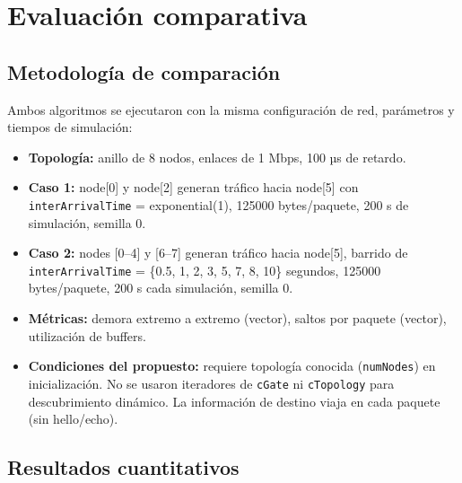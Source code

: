 \documentclass[10pt,letterpaper,twocolumn]{article}
\begin{document}
\FloatBarrier

\section{Evaluación comparativa}
\label{sec:evaluacion}

\subsection{Metodología de comparación}

Ambos algoritmos se ejecutaron con la misma configuración de red, parámetros y tiempos de simulación:
\begin{itemize}
  \item \textbf{Topología:} anillo de 8 nodos, enlaces de 1 Mbps, 100 µs de retardo.
  \item \textbf{Caso 1:} node[0] y node[2] generan tráfico hacia node[5] con \texttt{interArrivalTime} = exponential(1), 125000 bytes/paquete, 200 s de simulación, semilla 0.
  \item \textbf{Caso 2:} nodes [0--4] y [6--7] generan tráfico hacia node[5], barrido de \texttt{interArrivalTime} = \{0.5, 1, 2, 3, 5, 7, 8, 10\} segundos, 125000 bytes/paquete, 200 s cada simulación, semilla 0.
  \item \textbf{Métricas:} demora extremo a extremo (vector), saltos por paquete (vector), utilización de buffers.
  \item \textbf{Condiciones del propuesto:} requiere topología conocida (\texttt{numNodes}) en inicialización. No se usaron iteradores de \texttt{cGate} ni \texttt{cTopology} para descubrimiento dinámico. La información de destino viaja en cada paquete (sin hello/echo).
\end{itemize}

\FloatBarrier

\subsection{Resultados cuantitativos}
\end{document}
